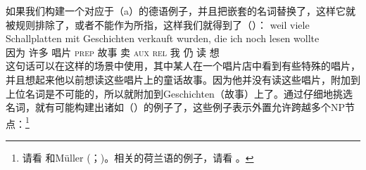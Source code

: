 如果我们构建一个对应于（a）的德语例子，并且把嵌套的名词替换了，这样它就被规则排除了，或者不能作为所指，这样我们就得到了（）：
\ea
\gll weil viele Schallplatten mit Geschichten verkauft wurden, die ich noch lesen wollte\\
	 因为 许多 唱片 \textsc{prep} 故事 卖 \textsc{aux} \textsc{rel} 我 仍 读 想\\
\z
这句话可以在这样的场景中使用，其中某人在一个唱片店中看到有些特殊的唱片，并且想起来他以前想读这些唱片上的童话故事。因为他并没有读这些唱片，附加到上位名词是不可能的，所以就附加到Geschichten（故事）上了。通过仔细地挑选名词，就有可能构建出诸如（）的例子了，这些例子表示外置允许跨越多个NP节点：\footnote{%
请看 和Müller (\citeyear{Mueller2004d}；\citeyear[\S~3]{Mueller2007c})。相关的荷兰语的例子，请看 。
}

